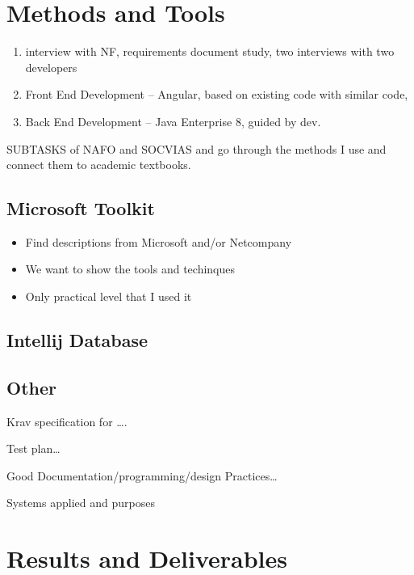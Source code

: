 \documentclass[../main.tex]{subfiles}
\begin{document}
\section{Methods and Tools}
\label{sec:methods}

\begin{enumerate}
\item interview with NF, requirements document study, two interviews with two developers 
\item Front End Development – Angular, based on existing code with similar code,  
\item Back End Development – Java Enterprise 8, guided by dev. 
\end{enumerate}

SUBTASKS of NAFO and SOCVIAS and go through the methods I use and connect them to academic textbooks.  


\subsection{Microsoft Toolkit}

\begin{itemize}
\item Find descriptions from Microsoft and/or Netcompany
\item We want to show the tools and techinques
\item Only practical level that I used it
\end{itemize}

\subsection{Intellij Database}
\subsection{Other}
Krav specification for …. 

Test plan… 

Good Documentation/programming/design Practices… 

Systems applied and purposes 


\section{Results and Deliverables}
\label{sec:results}
\end{document}
